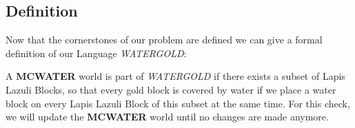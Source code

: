 \subsection{Definition}

Now that the cornerstones of our problem are defined we can give a formal definition of our Language \textit{WATERGOLD}:

\noindent A \textbf{MCWATER} world is part of \textit{WATERGOLD} if there exists a subset of Lapis Lazuli Blocks, so that every gold block is covered by water if we place a water block on every Lapis Lazuli Block of this subset at the same time. For this check, we will update the \textbf{MCWATER} world until no changes are made anymore.

